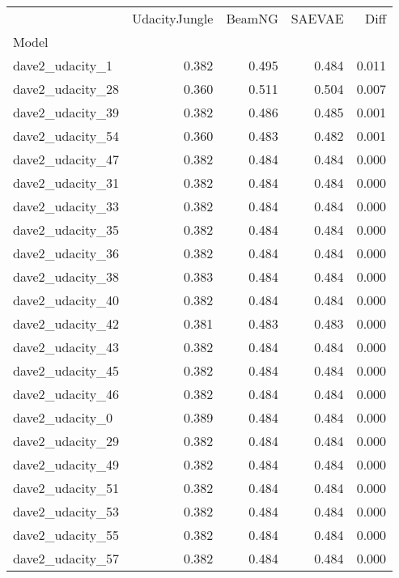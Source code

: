 \begin{tabular}{lrrrr}
\toprule
{} &  UdacityJungle &  BeamNG &  SAEVAE &   Diff \\
Model            &                &         &         &        \\
\midrule
dave2\_udacity\_1  &          0.382 &   0.495 &   0.484 &  0.011 \\
dave2\_udacity\_28 &          0.360 &   0.511 &   0.504 &  0.007 \\
dave2\_udacity\_39 &          0.382 &   0.486 &   0.485 &  0.001 \\
dave2\_udacity\_54 &          0.360 &   0.483 &   0.482 &  0.001 \\
dave2\_udacity\_47 &          0.382 &   0.484 &   0.484 &  0.000 \\
dave2\_udacity\_31 &          0.382 &   0.484 &   0.484 &  0.000 \\
dave2\_udacity\_33 &          0.382 &   0.484 &   0.484 &  0.000 \\
dave2\_udacity\_35 &          0.382 &   0.484 &   0.484 &  0.000 \\
dave2\_udacity\_36 &          0.382 &   0.484 &   0.484 &  0.000 \\
dave2\_udacity\_38 &          0.383 &   0.484 &   0.484 &  0.000 \\
dave2\_udacity\_40 &          0.382 &   0.484 &   0.484 &  0.000 \\
dave2\_udacity\_42 &          0.381 &   0.483 &   0.483 &  0.000 \\
dave2\_udacity\_43 &          0.382 &   0.484 &   0.484 &  0.000 \\
dave2\_udacity\_45 &          0.382 &   0.484 &   0.484 &  0.000 \\
dave2\_udacity\_46 &          0.382 &   0.484 &   0.484 &  0.000 \\
dave2\_udacity\_0  &          0.389 &   0.484 &   0.484 &  0.000 \\
dave2\_udacity\_29 &          0.382 &   0.484 &   0.484 &  0.000 \\
dave2\_udacity\_49 &          0.382 &   0.484 &   0.484 &  0.000 \\
dave2\_udacity\_51 &          0.382 &   0.484 &   0.484 &  0.000 \\
dave2\_udacity\_53 &          0.382 &   0.484 &   0.484 &  0.000 \\
dave2\_udacity\_55 &          0.382 &   0.484 &   0.484 &  0.000 \\
dave2\_udacity\_57 &          0.382 &   0.484 &   0.484 &  0.000 \\

\end{tabular}
